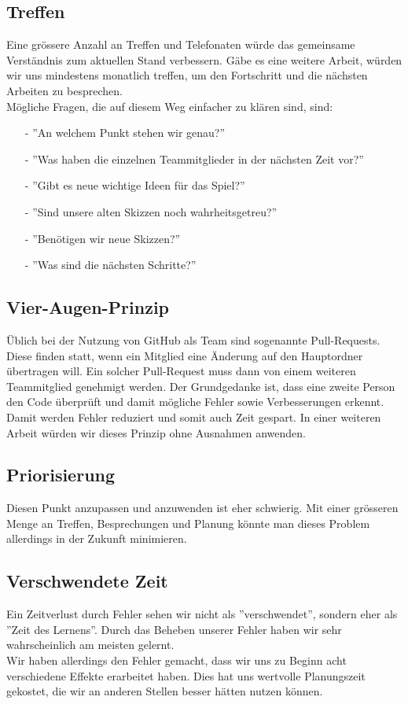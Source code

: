 \subsection*{Treffen}
Eine grössere Anzahl an Treffen und Telefonaten würde das gemeinsame Verständnis zum aktuellen Stand verbessern. Gäbe es eine weitere Arbeit, würden wir uns mindestens monatlich treffen, um den Fortschritt und die nächsten Arbeiten zu besprechen.\\
Mögliche Fragen, die auf diesem Weg einfacher zu klären sind, sind:
\begin{itemize}
    \item[-] ''An welchem Punkt stehen wir genau?''
    \item[-] ''Was haben die einzelnen Teammitglieder in der nächsten Zeit vor?''
    \item[-] ''Gibt es neue wichtige Ideen für das Spiel?''
    \item[-] ''Sind unsere alten Skizzen noch wahrheitsgetreu?''
    \item[-] ''Benötigen wir neue Skizzen?''
    \item[-] ''Was sind die nächsten Schritte?''
\end{itemize}


\subsection*{Vier-Augen-Prinzip}
Üblich bei der Nutzung von GitHub als Team sind sogenannte Pull-Requests. Diese finden statt, wenn ein Mitglied eine Änderung auf den Hauptordner übertragen will. Ein solcher
Pull-Request muss dann von einem weiteren Teammitglied genehmigt werden. Der Grundgedanke ist, dass eine zweite Person den Code überprüft und damit mögliche Fehler sowie Verbesserungen erkennt.
Damit werden Fehler reduziert und somit auch Zeit gespart. In einer weiteren Arbeit würden wir dieses Prinzip ohne Ausnahmen anwenden.


\subsection*{Priorisierung}
Diesen Punkt anzupassen und anzuwenden ist eher schwierig. Mit einer grösseren Menge an Treffen, Besprechungen und Planung könnte man dieses Problem allerdings in der Zukunft
minimieren.


\subsection*{Verschwendete Zeit}
Ein Zeitverlust durch Fehler sehen wir nicht als ''verschwendet'', sondern eher als ''Zeit des Lernens''. Durch das Beheben unserer Fehler haben wir sehr wahrscheinlich am meisten gelernt.\\
Wir haben allerdings den Fehler gemacht, dass wir uns zu Beginn acht verschiedene Effekte erarbeitet haben. Dies hat uns wertvolle Planungszeit gekostet, die wir an anderen Stellen besser hätten nutzen können.

